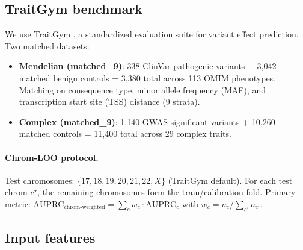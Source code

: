 
\subsection{TraitGym benchmark}
\label{app:data:traitgym}

We use TraitGym \citep{benegas2025traitgym}, a standardized evaluation suite for variant effect prediction. Two matched datasets:
\begin{itemize}
    \item \textbf{Mendelian (matched\_9)}: 338 ClinVar pathogenic variants + 3,042 matched benign controls = 3,380 total across 113 OMIM phenotypes. Matching on consequence type, minor allele frequency (MAF), and transcription start site (TSS) distance (9 strata).
    \item \textbf{Complex (matched\_9)}: 1,140 GWAS-significant variants + 10,260 matched controls = 11,400 total across 29 complex traits.
\end{itemize}

\paragraph{Chrom-LOO protocol.}
Test chromosomes: $\{17, 18, 19, 20, 21, 22, X\}$ (TraitGym default). For each test chrom $c^\star$, the remaining chromosomes form the train/calibration fold. Primary metric: $\mathrm{AUPRC}_{\mathrm{chrom\text{-}weighted}} = \sum_c w_c \cdot \mathrm{AUPRC}_c$ with $w_c = n_c / \sum_{c'} n_{c'}$.

\subsection{Input features}
\label{app:data:features}

